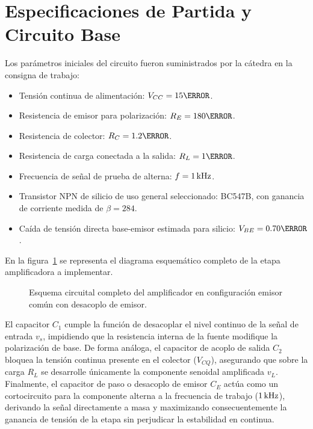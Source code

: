 \section{Especificaciones de Partida y Circuito Base}

Los parámetros iniciales del circuito fueron suministrados por la cátedra en la consigna de trabajo:
\begin{itemize}
  \item Tensión continua de alimentación: $V_{CC} = 15\V$.
  \item Resistencia de emisor para polarización: $R_E = 180\ohm$.
  \item Resistencia de colector: $R_C = 1.2\kohm$.
  \item Resistencia de carga conectada a la salida: $R_L = 1\kohm$.
  \item Frecuencia de señal de prueba de alterna: $f = 1\,\mathrm{kHz}$.
  \item Transistor NPN de silicio de uso general seleccionado: BC547B, con ganancia de corriente medida de $\beta = 284$.
  \item Caída de tensión directa base-emisor estimada para silicio: $V_{BE} = 0.70\V$.
\end{itemize}

En la figura~\ref{crkt:emisor_comun} se representa el diagrama esquemático completo de la etapa amplificadora a implementar.

\begin{figure}[!ht]
  \centering
  
  \caption{Esquema circuital completo del amplificador en configuración emisor común con desacoplo de emisor.}
  \label{crkt:emisor_comun}
\end{figure}

El capacitor $C_1$ cumple la función de desacoplar el nivel continuo de la señal de entrada $v_s$, impidiendo que la
resistencia interna de la fuente modifique la polarización de base. De forma análoga, el capacitor de acoplo de salida
$C_2$ bloquea la tensión continua presente en el colector ($V_{CQ}$), asegurando que sobre la carga $R_L$ se desarrolle
únicamente la componente senoidal amplificada $v_L$. Finalmente, el capacitor de paso o desacoplo de emisor $C_E$ actúa
como un cortocircuito para la componente alterna a la frecuencia de trabajo ($1\,\mathrm{kHz}$), derivando la señal directamente a
masa y maximizando consecuentemente la ganancia de tensión de la etapa sin perjudicar la estabilidad en continua.
